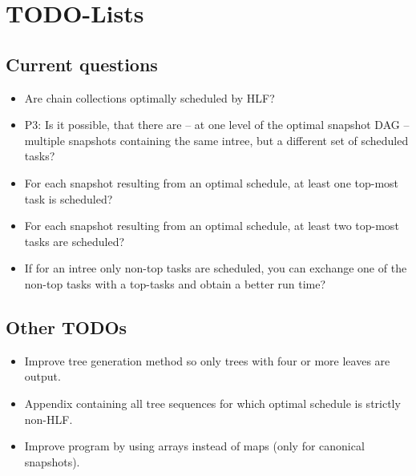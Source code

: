 \documentclass[a4paper, 11pt]{report}
\begin{document}
\chapter{TODO-Lists}
\label{chap:todo}

\section{Current questions}
\label{chap:current-questions}

\begin{itemize}
\item Are chain collections optimally scheduled by HLF?
\item P3: Is it possible, that there are -- at one level of the optimal snapshot DAG -- multiple snapshots containing the same intree, but a different set of scheduled tasks?
\item For each snapshot resulting from an optimal schedule, at least one top-most task is scheduled?
\item For each snapshot resulting from an optimal schedule, at least two top-most tasks are scheduled?
\item If for an intree only non-top tasks are scheduled, you can exchange one of the non-top tasks with a top-tasks and obtain a better run time?
\end{itemize}

\section{Other TODOs}

\begin{itemize}
\item Improve tree generation method so only trees with four or more leaves are output.
\item Appendix containing all tree sequences for which optimal schedule is strictly non-HLF.
\item Improve program by using arrays instead of maps (only for canonical snapshots).  
\end{itemize}

%
%
%
%
%
%
%

\end{document}

